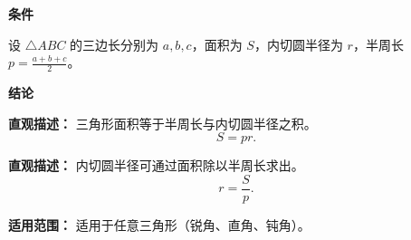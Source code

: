 \begin{statementbox}
	\textbf{\textcolor{CStatement}{条件}}
	\begin{description}[style=nextline, leftmargin=2.8em, labelsep=0.5em, itemsep=0.35em]
		\item[\textbf{\textcolor{CStatement}{条件 1（三角形要素）：}}] 设 $\triangle ABC$ 的三边长分别为 $a,b,c$，面积为 $S$，内切圆半径为 $r$，半周长 $p=\frac{a+b+c}{2}$。
	\end{description}

	\textbf{\textcolor{CStatement}{结论}}
	\begin{description}[style=nextline, leftmargin=2.8em, labelsep=0.5em, itemsep=0.45em]
		\item[\textbf{\textcolor{CStatement}{结论一（面积公式）：}}]
			\textbf{\textcolor{CStatement}{直观描述：}}
			三角形面积等于半周长与内切圆半径之积。
			\[
				S = pr.
			\]

		\item[\textbf{\textcolor{CStatement}{推广结论（半径公式）：}}]
			\textbf{\textcolor{CStatement}{直观描述：}}
			内切圆半径可通过面积除以半周长求出。
			\[
				r = \frac{S}{p}.
			\]
	\end{description}

	\textbf{\textcolor{CStatement}{适用范围：}}
	适用于任意三角形（锐角、直角、钝角）。
\end{statementbox}
